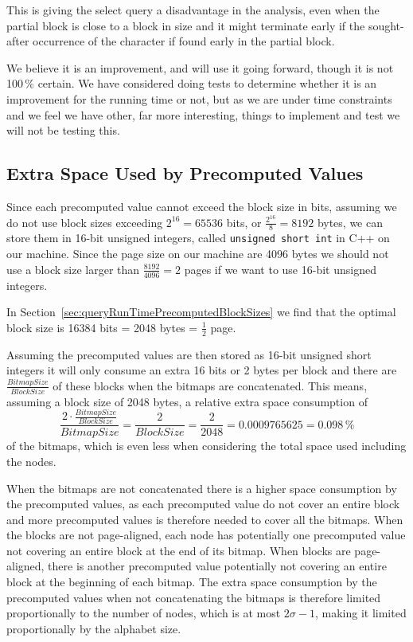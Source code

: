 This is giving the select query a disadvantage in the analysis, even when the partial block is close to a block in size and it might terminate early if the sought-after occurrence of the character if found early in the partial block.

We believe it is an improvement, and will use it going forward, though it is not 100\,\% certain.
We have considered doing tests to determine whether it is an improvement for the running time or not, but as we are under time constraints and we feel we have other, far more interesting, things to implement and test we will not be testing this.



\subsection{Extra Space Used by Precomputed Values}
Since each precomputed value cannot exceed the block size in bits, assuming we do not use block sizes exceeding $2^{16} = 65536$ bits, or $\frac{2^{16}}{8} = 8192$ bytes, we can store them in 16-bit unsigned integers, called \texttt{unsigned short int} in C++ on our machine.
Since the page size on our machine are 4096 bytes we should not use a block size larger than $\frac{8192}{4096} = 2$ pages if we want to use 16-bit unsigned integers.

In Section~\ref{sec:queryRunTimePrecomputedBlockSizes} we find that the optimal block size is 16384 bits = 2048 bytes = $\frac{1}{2}$ page.

Assuming the precomputed values are then stored as 16-bit unsigned short integers it will only consume an extra 16 bits or 2 bytes per block and there are $\frac{\mathit{BitmapSize}}{\mathit{BlockSize}}$ of these blocks when the bitmaps are concatenated.
This means, assuming a block size of 2048 bytes, a relative extra space consumption of
\[ \frac{ 2 \cdot \frac{\mathit{BitmapSize}}{\mathit{BlockSize}} }{\mathit{BitmapSize}} = \frac{2}{\mathit{BlockSize}} = \frac{2}{2048} = 0.0009765625 = 0.098\,\% \]
of the bitmaps, which is even less when considering the total space used including the nodes.

When the bitmaps are not concatenated there is a higher space consumption by the precomputed values, as each precomputed value do not cover an entire block and more precomputed values is therefore needed to cover all the bitmaps.
When the blocks are not page-aligned, each node has potentially one precomputed value not covering an entire block at the end of its bitmap.
When blocks are page-aligned, there is another precomputed value potentially not covering an entire block at the beginning of each bitmap.
The extra space consumption by the precomputed values when not concatenating the bitmaps is therefore limited proportionally to the number of nodes, which is at most $2 \sigma - 1$, making it limited proportionally by the alphabet size.

